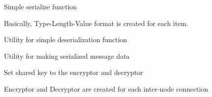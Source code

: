 \documentclass[letterpaper,10pt,english]{sphinxmanual}
\begin{document}

\begin{fulllineitems}
\label{\detokenize{bbc1.core.message_key_types:bbc1.core.message_key_types.make_binary}}
Simple serialize function

Basically, Type-Length-Value format is created for each item.

\end{fulllineitems}


\begin{fulllineitems}
\label{\detokenize{bbc1.core.message_key_types:bbc1.core.message_key_types.make_dictionary_from_TLV_format}}
Utility for simple deserialization function

\end{fulllineitems}


\begin{fulllineitems}
\label{\detokenize{bbc1.core.message_key_types:bbc1.core.message_key_types.make_message}}
Utility for making serialized message data

\end{fulllineitems}


\begin{fulllineitems}
\label{\detokenize{bbc1.core.message_key_types:bbc1.core.message_key_types.set_cipher}}
Set shared key to the encryptor and decryptor

Encryptor and Decryptor are created for each inter-node connection

\end{fulllineitems}
\end{document}
